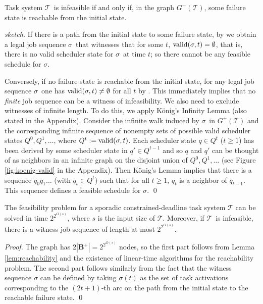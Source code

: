 \documentclass{llncs}
\newcommand{\tsys}{\ensuremath{\mathcal{T}}}
\newcommand{\seq}{\ensuremath{\sigma}}
\newcommand{\backlog}{\ensuremath{\mathbf{B}}}
\begin{document}
\begin{lemma}
\label{lem:reachability}
Task system \tsys\ is infeasible if and only if, in the graph $G^+(\tsys)$, some failure state is reachable from the initial state.  
\end{lemma}
\begin{proof}[sketch]
If there is a path from the initial state to some failure state, by  we obtain a legal job sequence \seq\ that witnesses that for some $t$, $\valid(\seq,t) = \emptyset$, that is, there is no valid scheduler state for \seq\ at time $t$; so there cannot be any feasible schedule for \seq. 

Conversely, if no failure state is reachable from the initial state, for any legal job sequence \seq\ one has $\valid(\seq,t) \neq \emptyset$ for all $t$ by . This immediately implies that no \emph{finite} job sequence can be a witness of infeasibility. We also need to exclude witnesses of infinite length. To do this, we apply K\"onig's Infinity Lemma \cite[Lemma 8.1.2]{Diestel:2005} (also stated in the Appendix). Consider the infinite walk induced by \seq\ in $G^+(\tsys)$ and the corresponding infinite sequence of nonempty sets of possible valid scheduler states $Q^{0}, Q^{1}, \ldots$, where $Q^t := \valid(\seq,t)$. Each scheduler state $q \in Q^{t}$ ($t \ge 1$) has been derived by some scheduler state in $q' \in Q^{t-1}$ and so $q$ and $q'$ can be thought of as neighbors in an infinite graph on the disjoint union of $Q^0, Q^1, \ldots$ (see Figure \ref{fig:koenig-valid} in the Appendix). Then K\"onig's Lemma implies that there is a sequence $q_0 q_1 \ldots$ (with $q_t \in Q^t$) such that for all $t \ge 1$, $q_t$ is a neighbor of $q_{t-1}$. This sequence defines a feasible schedule for $\seq$.
\qed 
\end{proof}



\begin{theorem}
\label{thm:main}
The feasibility problem for a sporadic constrained-deadline task system $\tsys$ can be solved in time $2^{2^{O(s)}}$, where $s$ is the input size of $\tsys$. Moreover, if \tsys\ is infeasible, there is a witness job sequence of length at most $2^{2^{O(s)}}$. 
\end{theorem}
\begin{proof}
The graph has $2|\backlog^+|=2^{2^{O(s)}}$ nodes, so the first part follows from Lemma \ref{lem:reachability} and the existence of linear-time algorithms for the reachability problem. The second part follows similarly from the fact that the witness sequence $\seq$ can be defined by taking $\seq(t)$ as the set of task activations corresponding to the $(2t+1)$-th arc on the path from the initial state to the reachable failure state.  
\qed
\end{proof}
\end{document}

